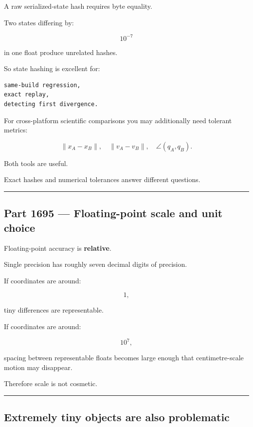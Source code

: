 A raw serialized-state hash requires byte equality.

Two states differing by:

\[
10^{-7}
\]

in one float produce unrelated hashes.

So state hashing is excellent for:

\begin{verbatim}
same-build regression,
exact replay,
detecting first divergence.
\end{verbatim}

For cross-platform scientific comparisons you may additionally need tolerant metrics:

\[
\|x_A-x_B\|,
\quad
\|v_A-v_B\|,
\quad
\angle(q_A,q_B).
\]

Both tools are useful.

Exact hashes and numerical tolerances answer different questions.

\begin{center}\rule{0.5\linewidth}{0.5pt}\end{center}

\subsection{Part 1695 --- Floating-point scale and unit choice}\label{06-engine-ii-ch039-part-1695-floating-point-scale-and-unit-choice}

\hypertarget{06-engine-ii-ch039-part-1695-floating-point-scale-and-unit-choice}{}

Floating-point accuracy is \textbf{relative}.

Single precision has roughly seven decimal digits of precision.

If coordinates are around:

\[
1,
\]

tiny differences are representable.

If coordinates are around:

\[
10^7,
\]

spacing between representable floats becomes large enough that centimetre-scale motion may disappear.

Therefore scale is not cosmetic.

\begin{center}\rule{0.5\linewidth}{0.5pt}\end{center}

\subsection{Extremely tiny objects are also problematic}\label{06-engine-ii-ch039-extremely-tiny-objects-are-also-problematic}

